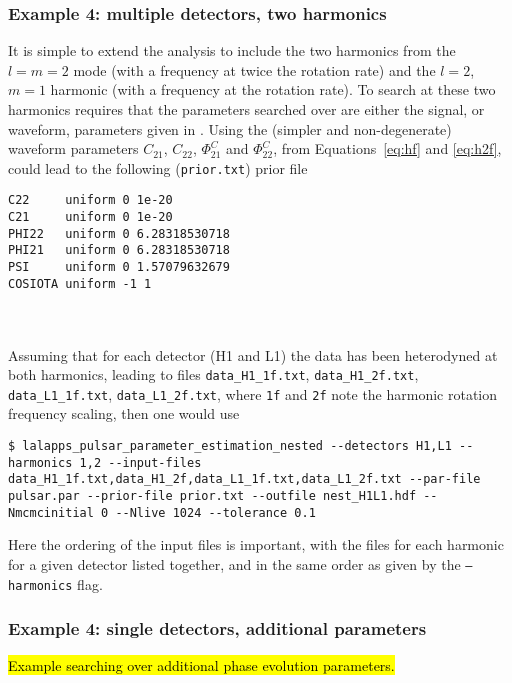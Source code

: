 \subsubsection{Example 4: multiple detectors, two harmonics}

It is simple to extend the analysis to include the two harmonics from the $l=m=2$ mode (with a \gw frequency at twice the rotation rate) and the $l=2$, $m=1$
harmonic (with a \gw frequency at the rotation rate). To search at these two harmonics requires that the parameters searched over are either the signal, or
waveform, parameters given in \citet{2015MNRAS.453.4399P}. Using the (simpler and non-degenerate) waveform parameters $C_{21}$, $C_{22}$, $\Phi_{21}^C$ and
$\Phi_{22}^C$, from Equations~\ref{eq:hf} and \ref{eq:h2f}, could lead to the following ({\tt prior.txt}) prior file
\begin{lrbox}{\Lst}
\begin{lstlisting}
C22     uniform 0 1e-20
C21     uniform 0 1e-20
PHI22   uniform 0 6.28318530718
PHI21   uniform 0 6.28318530718
PSI     uniform 0 1.57079632679
COSIOTA uniform -1 1
\end{lstlisting}
\end{lrbox}
\\[5pt] \indent \fbox{\usebox{\Lst}} \\[5pt]
Assuming that for each detector (H1 and L1) the data has been heterodyned at both harmonics, leading to files {\tt data\_H1\_1f.txt}, {\tt data\_H1\_2f.txt},
{\tt data\_L1\_1f.txt}, {\tt data\_L1\_2f.txt}, where {\tt 1f} and {\tt 2f} note the harmonic rotation frequency scaling, then one would use
\begin{lstlisting}[frame=single]
$ lalapps_pulsar_parameter_estimation_nested --detectors H1,L1 --harmonics 1,2 --input-files data_H1_1f.txt,data_H1_2f,data_L1_1f.txt,data_L1_2f.txt --par-file pulsar.par --prior-file prior.txt --outfile nest_H1L1.hdf --Nmcmcinitial 0 --Nlive 1024 --tolerance 0.1
\end{lstlisting}
Here the ordering of the input files is important, with the files for each harmonic for a given detector listed together, and in the same order as given by the
{\tt --harmonics} flag.

\subsubsection{Example 4: single detectors, additional parameters}

\hl{Example searching over additional phase evolution parameters.}

